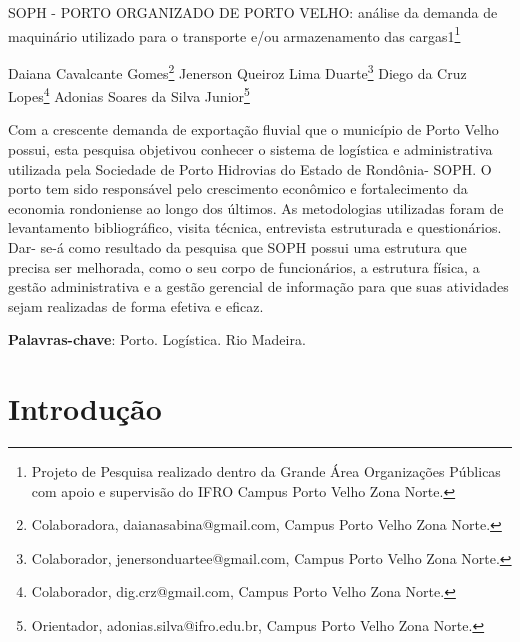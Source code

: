 \documentclass[article,12pt,onesidea,4paper,english,brazil]{abntex2}
\begin{document}
	
	
	\frenchspacing 
	
	\begin{center}
		\LARGE SOPH - PORTO ORGANIZADO DE PORTO VELHO: análise da demanda de maquinário utilizado para o transporte e/ou armazenamento das cargas1\footnote{Projeto de Pesquisa realizado dentro da Grande Área Organizações Públicas com apoio e supervisão do IFRO Campus Porto Velho Zona Norte.}
		
		\normalsize
		Daiana Cavalcante Gomes\footnote{Colaboradora, daianasabina@gmail.com, Campus Porto Velho Zona Norte.} 
		Jenerson Queiroz Lima Duarte\footnote{Colaborador, jenersonduartee@gmail.com, Campus Porto Velho Zona Norte.} 
	Diego da Cruz Lopes\footnote{Colaborador, dig.crz@gmail.com, Campus Porto Velho Zona Norte.} 
	Adonias Soares da Silva Junior\footnote{Orientador, adonias.silva@ifro.edu.br, Campus Porto Velho Zona Norte.} 
	\end{center}
	
	\begin{resumoumacoluna}
		Com a crescente demanda de exportação fluvial que o município de Porto Velho possui, esta pesquisa objetivou conhecer o sistema de logística e administrativa utilizada pela Sociedade de Porto Hidrovias do Estado de Rondônia- SOPH. O porto tem sido responsável pelo crescimento econômico e fortalecimento da economia rondoniense ao longo dos últimos. As metodologias utilizadas foram de levantamento bibliográfico, visita técnica, entrevista estruturada e questionários. Dar- se-á como resultado da pesquisa que SOPH possui uma estrutura que precisa ser melhorada, como o seu corpo de funcionários, a estrutura física, a gestão administrativa e a gestão gerencial de informação para que suas atividades sejam realizadas de forma efetiva e eficaz.
		
		\vspace{\onelineskip}
		
		\noindent
		\textbf{Palavras-chave}: Porto. Logística. Rio Madeira.
	\end{resumoumacoluna}
	
	\textual
	
	\section*{Introdução}
	
\end{document}
